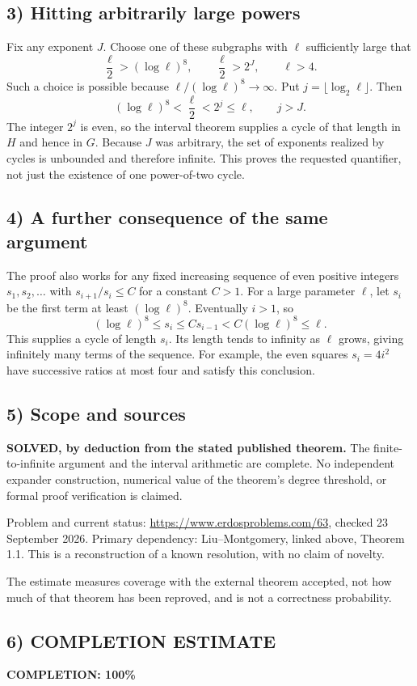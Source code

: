 \subsection*{3) Hitting arbitrarily large powers}
Fix any exponent $J$. Choose one of these subgraphs with $\ell$ sufficiently large that
\[
 \frac{\ell}{2}>(\log\ell)^8,\qquad \frac{\ell}{2}>2^J,
 \qquad \ell>4.
\]
Such a choice is possible because $\ell/(\log\ell)^8\to\infty$. Put $j=\lfloor\log_2\ell\rfloor$. Then
\[
 (\log\ell)^8<\frac\ell2<2^j\le\ell,
 \qquad j>J.
\]
The integer $2^j$ is even, so the interval theorem supplies a cycle of that length in $H$ and hence in $G$. Because $J$ was arbitrary, the set of exponents realized by cycles is unbounded and therefore infinite. This proves the requested quantifier, not just the existence of one power-of-two cycle.

\subsection*{4) A further consequence of the same argument}
The proof also works for any fixed increasing sequence of even positive integers $s_1,s_2,\ldots$ with $s_{i+1}/s_i\le C$ for a constant $C>1$. For a large parameter $\ell$, let $s_i$ be the first term at least $(\log\ell)^8$. Eventually $i>1$, so
\[
 (\log\ell)^8\le s_i\le C s_{i-1}<C(\log\ell)^8\le\ell.
\]
This supplies a cycle of length $s_i$. Its length tends to infinity as $\ell$ grows, giving infinitely many terms of the sequence. For example, the even squares $s_i=4i^2$ have successive ratios at most four and satisfy this conclusion.

\subsection*{5) Scope and sources}
\textbf{SOLVED, by deduction from the stated published theorem.} The finite-to-infinite argument and the interval arithmetic are complete. No independent expander construction, numerical value of the theorem's degree threshold, or formal proof verification is claimed.

Problem and current status: \url{https://www.erdosproblems.com/63}, checked 23 September 2026. Primary dependency: Liu--Montgomery, linked above, Theorem 1.1. This is a reconstruction of a known resolution, with no claim of novelty.

The estimate measures coverage with the external theorem accepted, not how much of that theorem has been reproved, and is not a correctness probability.
\subsection*{6) COMPLETION ESTIMATE}
\textbf{COMPLETION: 100\%}
